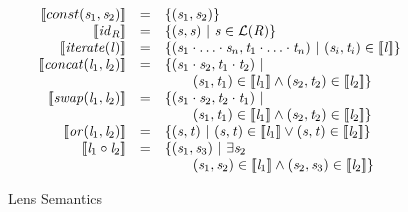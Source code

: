 \documentclass[numbers]{sigplanconf}
\begin{document}
\begin{figure}
  \[
    \begin{array}{rcl}
      \SemanticsOf{const(\String_1,\String_2)} &=& \SetOf{(\String_1,\String_2)}\\

      \SemanticsOf{\IdentityLensOf{\Regex}} &=& \SetOf{(\String,\String)\SuchThat\String\in\LanguageOf{\Regex}}\\

      \SemanticsOf{\IterateLensOf{\Lens}} &=& \SetOf{(\String_1\Concat\ldots\Concat\String_n,
                                              \StringAlt_1\Concat\ldots\Concat\StringAlt_n)\SuchThat
                                              (\String_i,\StringAlt_i)\in\SemanticsOf{\Lens}}\\

      \SemanticsOf{\ConcatLensOf{\Lens_1}{\Lens_2}} &=&
                                                        \SetOf{(\String_1\Concat\String_2,\StringAlt_1\Concat\StringAlt_2)\SuchThat\\
                                               & & \hspace*{2em}(\String_1,\StringAlt_1)\in\SemanticsOf{\Lens_1}\BooleanAnd
                                                   (\String_2,\StringAlt_2)\in\SemanticsOf{\Lens_2}}\\

      \SemanticsOf{\SwapLensOf{\Lens_1}{\Lens_2}} &=&
                                                      \SetOf{(\String_1\Concat\String_2,\StringAlt_2\Concat\StringAlt_1)\SuchThat\\
                                               & & \hspace*{2em}(\String_1,\StringAlt_1)\in\SemanticsOf{\Lens_1}\BooleanAnd
                                                   (\String_2,\StringAlt_2)\in\SemanticsOf{\Lens_2}}\\

      \SemanticsOf{\OrLensOf{\Lens_1}{\Lens_2}} &=&
                                                    \SetOf{(\String,\StringAlt)
                                                    \SuchThat(\String,\StringAlt)\in\SemanticsOf{\Lens_1}
                                                    \BooleanOr(\String,\StringAlt)\in\SemanticsOf{\Lens_2}}\\

      \SemanticsOf{\ComposeLensOf{\Lens_1}{\Lens_2}} &=&
                                                         \SetOf{(\String_1,\String_3)\SuchThat\exists\String_2\\
                                               & & \hspace*{2em}(\String_1,\String_2)\in\SemanticsOf{\Lens_1}\BooleanAnd
                                                   (\String_2,\String_3)\in\SemanticsOf{\Lens_2}}
    \end{array}
  \]
  \caption{Lens Semantics}
  \label{fig:lens-semantics}
\end{figure}
\end{document}
